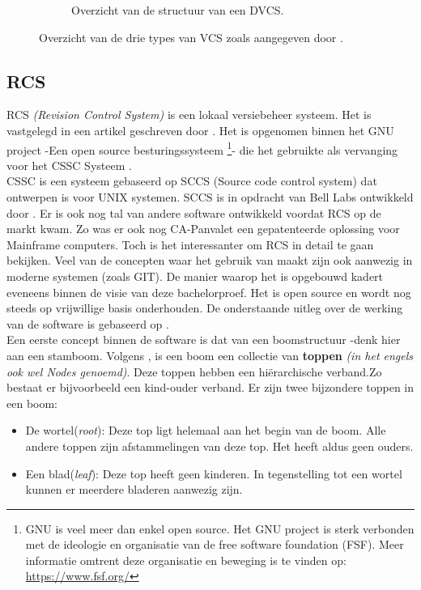 \begin{figure}[h!]
\begin{subfigure}{.5\textwidth}
	\caption[Overzicht structuur DVCS]{Overzicht van de structuur van een DVCS.}
	\end{subfigure}
	
	\caption[Overzicht types VCS]{Overzicht van de drie types van VCS zoals aangegeven door \textcite{Chacon2014}.}
	\label{fig:TypesVCS}
\end{figure}

	
\subsection{RCS}
\label{sec:RCS}


RCS \textit{(Revision Control System)} is een lokaal versiebeheer systeem. Het is vastgelegd in een artikel geschreven door \textcite{Tichy85rcs}. Het is opgenomen binnen het GNU project -Een open source besturingssysteem \footnote{GNU is veel meer dan enkel open source. Het GNU project is sterk verbonden met de ideologie en organisatie van de free software foundation (FSF). Meer informatie omtrent deze organisatie en beweging is te vinden op: \url{https://www.fsf.org/}}- die het gebruikte als vervanging voor het CSSC Systeem \autocite{GNUCSSC}.\\

CSSC is een systeem gebaseerd op SCCS (Source code control system) dat ontwerpen is voor UNIX systemen. SCCS is in opdracht van Bell Labs ontwikkeld door \textcite{Rochkind1975}. Er is ook nog tal van andere software ontwikkeld voordat RCS op de markt kwam. Zo was er ook nog CA-Panvalet een gepatenteerde oplossing voor Mainframe computers. Toch is het interessanter om RCS in detail te gaan bekijken. Veel van de concepten waar het gebruik van maakt zijn ook aanwezig in moderne systemen (zoals GIT). De manier waarop het is opgebouwd kadert eveneens binnen de visie van deze bachelorproef. Het is open source en wordt nog steeds op vrijwillige basis onderhouden. De onderstaande uitleg over de werking van de software is gebaseerd op \textcite{Tichy85rcs}.\\

Een eerste concept binnen de software is dat van een boomstructuur -denk hier aan een stamboom. Volgens \textcite{Lievens2019}, is een boom een collectie van \textbf{toppen} \textit{(in het engels ook wel Nodes genoemd)}. Deze toppen hebben een hiërarchische verband.Zo bestaat er bijvoorbeeld een kind-ouder verband. Er zijn twee bijzondere toppen in een boom:

\begin{itemize}
	\item De wortel(\textit{root}): Deze top ligt helemaal aan het begin van de boom. Alle andere toppen zijn afstammelingen van deze top. Het heeft aldus geen ouders.
	\item Een blad(\textit{leaf}): Deze top heeft geen kinderen. In tegenstelling tot een wortel kunnen er meerdere bladeren aanwezig zijn.
\end{itemize}

